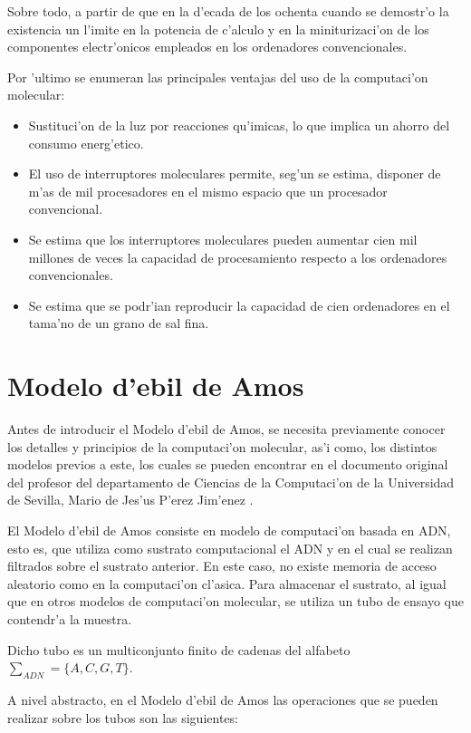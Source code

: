 \documentclass[12pt]{article}
\begin{document}
Sobre todo, a partir de que en la d'ecada de los ochenta cuando se demostr'o la existencia un l'imite en la potencia
de c'alculo y en la miniturizaci'on de los componentes electr'onicos empleados en los ordenadores convencionales.

Por 'ultimo se enumeran las principales ventajas del uso de la computaci'on molecular:

\begin{itemize}
	\item Sustituci'on de la luz por reacciones qu'imicas, lo que implica un ahorro del consumo energ'etico.
	\item El uso de interruptores moleculares permite, seg'un se estima, disponer de m'as de mil procesadores
    en el mismo espacio que un procesador convencional.
	\item Se estima que los interruptores moleculares pueden aumentar cien mil millones de veces la capacidad
    de procesamiento respecto a los ordenadores convencionales.
	\item Se estima que se podr'ian reproducir la capacidad de cien ordenadores en el tama'no de un grano de sal fina.
\end{itemize}

\section{Modelo d'ebil de Amos}

Antes de introducir el Modelo d'ebil de Amos, se necesita previamente conocer los detalles y principios
de la computaci'on molecular, as'i como, los distintos modelos previos a este, los cuales se pueden encontrar
en el documento original del profesor del departamento de Ciencias de la Computaci'on de la Universidad
de Sevilla, Mario de Jes'us P'erez Jim'enez \cite{Mario-deJesus}.

El Modelo d'ebil de Amos consiste en modelo de computaci'on basada en ADN, esto es, que utiliza como sustrato
computacional el ADN y en el cual se realizan filtrados sobre el sustrato anterior. En este caso, no existe
memoria de acceso aleatorio como en la computaci'on cl'asica. Para almacenar el sustrato, al igual que en otros
modelos de computaci'on molecular, se utiliza un tubo de ensayo que contendr'a la muestra.

Dicho tubo es un multiconjunto finito de cadenas del alfabeto $\sum_{ADN} = \{A, C, G, T\}$.

A nivel abstracto, en el Modelo d'ebil de Amos las operaciones que se pueden realizar sobre los tubos
son las siguientes:
\end{document}
